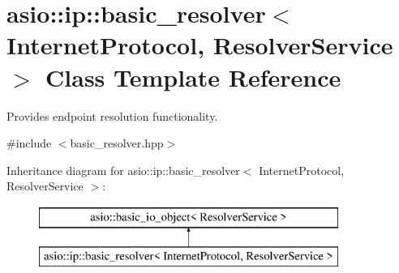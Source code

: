 \hypertarget{classasio_1_1ip_1_1basic__resolver}{}\section{asio\+:\+:ip\+:\+:basic\+\_\+resolver$<$ Internet\+Protocol, Resolver\+Service $>$ Class Template Reference}
\label{classasio_1_1ip_1_1basic__resolver}


Provides endpoint resolution functionality.  




{\ttfamily \#include $<$basic\+\_\+resolver.\+hpp$>$}

Inheritance diagram for asio\+:\+:ip\+:\+:basic\+\_\+resolver$<$ Internet\+Protocol, Resolver\+Service $>$\+:\begin{figure}[H]
\begin{center}
\leavevmode
\includegraphics[height=2.000000cm]{classasio_1_1ip_1_1basic__resolver}
\end{center}
\end{figure}
